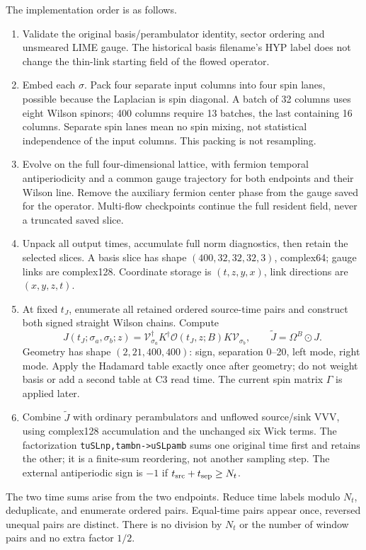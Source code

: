 \documentclass[11pt]{article}
\numberwithin{equation}{section}
\begin{document}
The implementation order is as follows.
\begin{enumerate}
 \item Validate the original basis/perambulator identity, sector ordering
 and unsmeared LIME gauge. The historical basis filename's HYP label does
 not change the thin-link starting field of the flowed operator.
 \item Embed each \(\sigma\). Pack four separate input columns into four
 spin lanes, possible because the Laplacian is spin diagonal. A batch of
 32 columns uses eight Wilson spinors; 400 columns require 13 batches,
 the last containing 16 columns. Separate spin lanes mean no spin mixing,
 not statistical independence of the input columns. This packing is not resampling.
 \item Evolve on the full four-dimensional lattice, with fermion temporal
 antiperiodicity and a common gauge trajectory for both endpoints and
 their Wilson line. Remove the auxiliary fermion center phase from the
 gauge saved for the operator. Multi-flow checkpoints continue the full
 resident field, never a truncated saved slice.
 \item Unpack all output times, accumulate full norm diagnostics, then
 retain the selected slices. A basis slice has shape
 \((400,32,32,32,3)\), complex64; gauge links are complex128. Coordinate
 storage is \((t,z,y,x)\), link directions are \((x,y,z,t)\).
 \item At fixed \(t_J\), enumerate all retained ordered source-time pairs
 and construct both signed straight Wilson chains. Compute
 \begin{equation}
 J(t_J;\sigma_a,\sigma_b;z)
 =\mathcal V_{\sigma_a}^\dagger K^\dagger
    \mathcal O(t_J,z;B)K\mathcal V_{\sigma_b},\qquad
 \widetilde J=\Omega^B\odot J.
 \end{equation}
 Geometry has shape \((2,21,400,400)\): sign, separation 0--20, left
 mode, right mode. Apply the Hadamard table exactly once after geometry;
 do not weight basis or add a second table at C3 read time. The current
 spin matrix \(\Gamma\) is applied later.
 \item Combine \(\widetilde J\) with ordinary perambulators and unflowed
 source/sink VVV, using complex128 accumulation and the unchanged six
 Wick terms. The factorization
 \texttt{tuSLnp,tambn->uSLpamb} sums one original time first and retains
 the other; it is a finite-sum reordering, not another sampling step.
 The external antiperiodic sign is \(-1\) if
 \(t_{\rm src}+t_{\rm sep}\ge N_t\).
\end{enumerate}
The two time sums arise from the two endpoints. Reduce time labels modulo
\(N_t\), deduplicate, and enumerate ordered pairs. Equal-time pairs appear
once, reversed unequal pairs are distinct. There is no division by
\(N_t\) or the number of window pairs and no extra factor \(1/2\).
\end{document}
